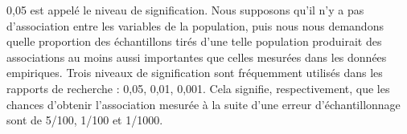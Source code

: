 \documentclass[
]{article}
\begin{document}
0,05 est appelé le niveau de signification. Nous supposons qu'il n'y a
pas d'association entre les variables de la population, puis nous nous
demandons quelle proportion des échantillons tirés d'une telle
population produirait des associations au moins aussi importantes que
celles mesurées dans les données empiriques. Trois niveaux de
signification sont fréquemment utilisés dans les rapports de recherche :
0,05, 0,01, 0,001. Cela signifie, respectivement, que les chances
d'obtenir l'association mesurée à la suite d'une erreur
d'échantillonnage sont de 5/100, 1/100 et 1/1000.
\end{document}
